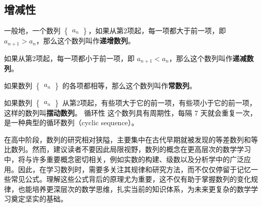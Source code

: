 \subsection{增减性}
一般地，一个数列 $\begin{Bmatrix} a_n \end{Bmatrix}$，如果从第2项起，每一项都大于前一项，即 $a_{n+1}>a_n$，那么这个数列叫作\textbf{递增数列}。

如果从第2项起，每一项都小于前一项，即 $a_{n+1}<a_n$，那么这个数列叫作\textbf{递减数列}。

如果数列 $\begin{Bmatrix} a_n \end{Bmatrix}$ 的各项都相等，那么这个数列叫作\textbf{常数列}。

如果数列 $\begin{Bmatrix} a_n \end{Bmatrix}$ 从第2项起，有些项大于它的前一项，有些项小于它的前一项，这样的数列叫\textbf{摆动数列}。
循环性
这个数列具有周期性，每隔 7 天就会重复一次，是一种典型的循环数列（cyclic sequence）。

在高中阶段，数列的研究相对狭隘，主要集中在古代早期就被发现的等差数列和等比数列。然而，建议读者不要因此局限视野，数列的概念在更高层次的数学学习中，将与许多重要概念密切相关，例如实数的构建、级数以及分析学中的广泛应用。因此，在学习数列时，需要多关注其规律和研究方法，而不仅仅停留于记忆一些常见公式。理解这些公式背后的原理尤为重要，这不仅有助于掌握数列的变化规律，也能培养更深层次的数学思维，扎实当前的知识体系，为未来更复杂的数学学习奠定坚实的基础。